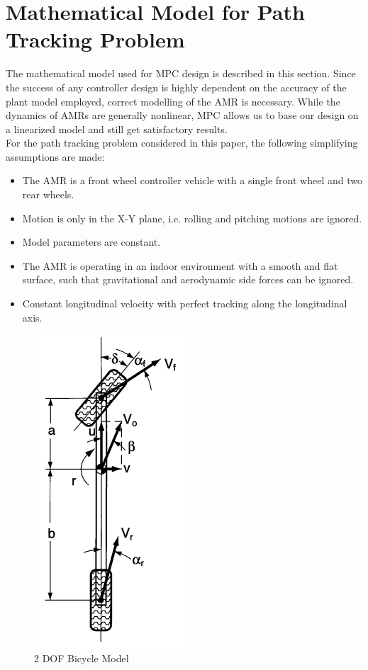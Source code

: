 \documentclass[a4paper, twocolumn]{article}
\begin{document}
\section{Mathematical Model for Path Tracking Problem}

The mathematical model used for MPC design is described in this section. Since the success of any controller design is highly 
dependent on the accuracy of the plant model employed, correct modelling of the AMR is necessary. While the dynamics of 
AMRs are generally nonlinear, MPC allows us to base our design on a linearized model and still get satisfactory results. \\
For the path tracking problem considered in this paper, the following simplifying assumptions are made:
\begin{itemize}[itemsep=2pt]
    \item The AMR is a front wheel controller vehicle with a single front wheel and two rear wheels.
    \item Motion is only in the X-Y plane, i.e. rolling and pitching motions are ignored.
    \item Model parameters are constant.
    \item The AMR is operating in an indoor environment with a smooth and flat surface, such that gravitational and aerodynamic side forces can be ignored.
    \item Constant longitudinal velocity with perfect tracking along the longitudinal axis.
\end{itemize}

\begin{figure}
    \centering
    \includegraphics[scale=.45]{presentation/img/2DOF-bicycle.png}
    \caption{2 DOF Bicycle Model \cite{kiefer1}}
    \label{fig:2dof}
\end{figure}
\end{document}
